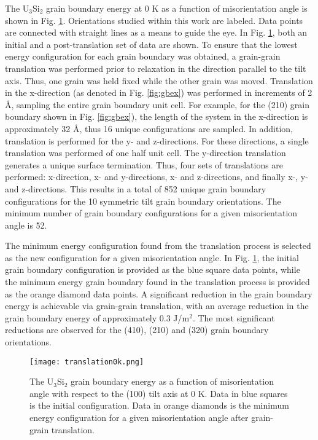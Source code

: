 \documentclass[review]{elsarticle}
\begin{document}
The U$_{3}$Si$_{2}$ grain boundary energy at 0 K as a function of misorientation angle is shown in Fig. \ref{fig:translate}. Orientations studied within this work are labeled. Data points are connected with straight lines as a means to guide the eye. In Fig. \ref{fig:translate}, both an initial and a post-translation set of data are shown. To ensure that the lowest energy configuration for each grain boundary was obtained, a grain-grain translation was performed prior to relaxation in the direction parallel to the tilt axis. Thus, one grain was held fixed while the other grain was moved. Translation in the x-direction (as denoted in Fig. \ref{fig:gbex}) was performed in increments of 2 {\AA}, sampling the entire grain boundary unit cell. For example, for the (210) grain boundary shown in Fig. \ref{fig:gbex}), the length of the system in the x-direction is approximately 32 {\AA}, thus 16 unique configurations are sampled. In addition, translation is performed for the y- and z-directions. For these directions, a single translation was performed of one half unit cell. The y-direction translation generates a unique surface termination. Thus, four sets of translations are performed: x-direction, x- and y-directions, x- and z-directions, and finally x-, y- and z-directions. This results in a total of 852 unique grain boundary configurations for the 10 symmetric tilt grain boundary orientations. The minimum number of grain boundary configurations for a given misorientation angle is 52. 

The minimum energy configuration found from the translation process is selected as the new configuration for a given misorientation angle. In Fig. \ref{fig:translate}, the initial grain boundary configuration is provided as the blue square data points, while the minimum energy grain boundary found in the translation process is provided as the orange diamond data points. A significant reduction in the grain boundary energy is achievable via grain-grain translation, with an average reduction in the grain boundary energy of approximately 0.3 J/m$^{2}$. The most significant reductions are observed for the (410), (210) and (320) grain boundary orientations. 

\begin{figure}[h]
 \centering
 \texttt{[image: translation0k.png]} 
 \caption{The U$_{3}$Si$_{2}$ grain boundary energy as a function of misorientation angle with respect to the (100) tilt axis at 0 K. Data in blue squares is the initial configuration. Data in orange diamonds is the minimum energy configuration for a given misorientation angle after grain-grain translation.}
 \label{fig:translate}
\end{figure}
\end{document}
